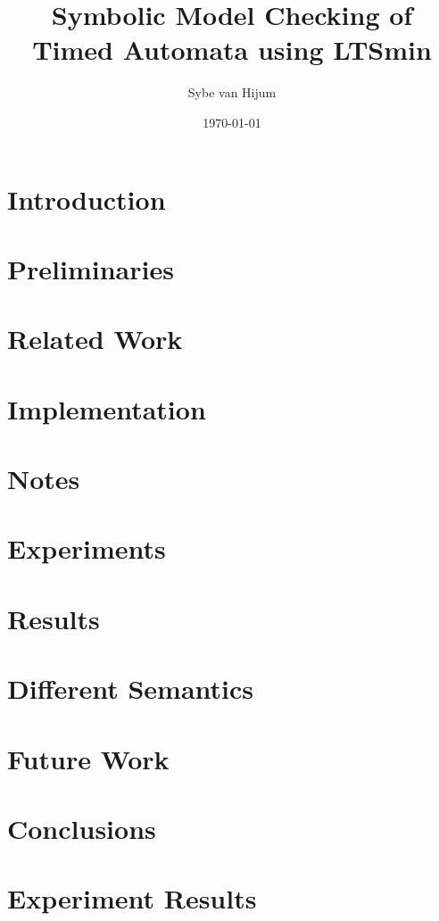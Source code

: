\documentclass[11pt,a4paper]{article}
\newcommand{\ltsmin}{LTSmin}
\begin{document}
\newtheorem{mydef}{Definition}
\newtheorem{myconjecture}{Conjecture}
\title{Symbolic Model Checking of Timed Automata using \ltsmin{}}
\author{Sybe van Hijum}
\date{\today{}}
\maketitle

\clearpage
\tableofcontents

\clearpage
\section{Introduction}


%

\clearpage
\section{Preliminaries}


\clearpage
\section{Related Work}


\clearpage
\section{Implementation}


%

\clearpage
\section{Notes}


\clearpage
\section{Experiments}


\clearpage
\section{Results}


\clearpage
\section{Different Semantics}


\clearpage
\section{Future Work}


\clearpage
\section{Conclusions}


\clearpage
{}


\clearpage
\appendix
\section{Experiment Results}
\label{app:results}

\end{document}
